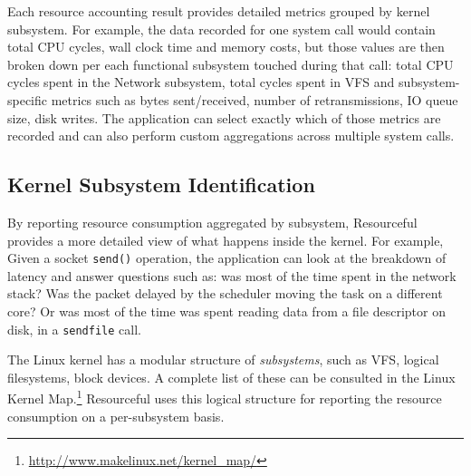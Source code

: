 \documentclass[letterpaper,twocolumn,10pt]{article}
\newcommand{\pname}{Resourceful}
\newcommand{\lnote}[1]{\textcolor{red}{[\textit{#1}]}} %
\begin{document}
Each resource accounting result provides detailed metrics grouped by kernel
subsystem. For example, the data recorded for one system call would contain
total CPU cycles, wall clock time and memory costs, but those
values are then broken down per each functional subsystem touched during that call: total
CPU cycles spent in the Network subsystem, total cycles spent in VFS and
subsystem-specific metrics such as bytes sent/received, number of
retransmissions, IO queue size, disk writes. The application can select exactly
which of those metrics are recorded and can also perform custom aggregations
across multiple system calls.

\subsection{Kernel Subsystem Identification}
By reporting resource consumption aggregated by subsystem, Resourceful provides
a more detailed view of what happens inside the kernel. For example,  Given a
socket \texttt{send()} operation, the application can look at the breakdown
of latency and answer questions such as: was most of the time spent in the
network stack? Was the packet delayed by the scheduler moving the task on a
different core? Or was most of the time was spent reading data from a file
descriptor on disk, in a \texttt{sendfile} call.
 
The Linux kernel has a modular structure of \emph{subsystems}, such as VFS,
logical filesystems, block devices. A complete list of these can be consulted in
the Linux Kernel Map.\footnote{\url{http://www.makelinux.net/kernel_map/}}
\pname{ }uses this logical structure for reporting the resource consumption on a
per-subsystem basis. 


\end{document}
